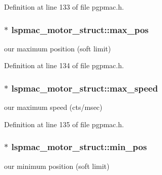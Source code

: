Definition at line 133 of file pgpmac.\-h.

\hypertarget{structlspmac__motor__struct_aac8c31a857910cdcbb409331e128e766}{
\subsubsection[{max\-\_\-pos}]{$\ast$ lspmac\-\_\-motor\-\_\-struct\-::max\-\_\-pos}}\label{structlspmac__motor__struct_aac8c31a857910cdcbb409331e128e766}


our maximum position (soft limit) 



Definition at line 134 of file pgpmac.\-h.

\hypertarget{structlspmac__motor__struct_a69e49769a1001665377efc7193d88a0a}{
\subsubsection[{max\-\_\-speed}]{$\ast$ lspmac\-\_\-motor\-\_\-struct\-::max\-\_\-speed}}\label{structlspmac__motor__struct_a69e49769a1001665377efc7193d88a0a}


our maximum speed (cts/msec) 



Definition at line 135 of file pgpmac.\-h.

\hypertarget{structlspmac__motor__struct_a7c1f2f67c64d26b12d6bb0d681797d8d}{
\subsubsection[{min\-\_\-pos}]{$\ast$ lspmac\-\_\-motor\-\_\-struct\-::min\-\_\-pos}}\label{structlspmac__motor__struct_a7c1f2f67c64d26b12d6bb0d681797d8d}


our minimum position (soft limit) 



